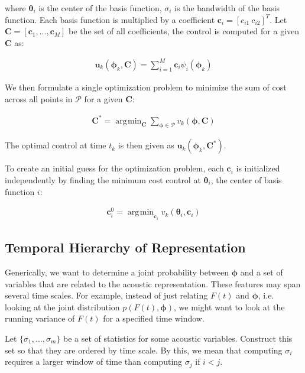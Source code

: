 \documentclass{article} %
\DeclareMathOperator*{\argmin}{\arg\!\min}
\begin{document}
where $\bm{\theta}_i$ is the center of the basis function, $\sigma_i$ is the bandwidth of
the basis function. Each basis function is multiplied by a coefficient
$\bm{c}_i = \left[ c_{i1} ~ c_{i2} \right]^T$. Let $\bm{C}=\left[ \bm{c}_1, ... ,\bm{c}_M \right]$
be the set of all coefficients, the control is computed for a given $\bm{C}$ as:

\begin{align*}
\bm{u}_k(\bm{\phi}_k, \bm{C}) = \sum_{i=1}^M \bm{c}_i \psi_i(\bm{\phi}_k)
\end{align*}

We then formulate a single optimization problem to minimize the sum of cost
across all points in $\mathcal{P}$ for a given $\bm{C}$:

\begin{align*}
\bm{C}^* = \argmin_{\bm{C}} \sum_{\bm{\phi} \in \mathcal{P}} v_k( \bm{\phi}, \bm{C} )
\end{align*}

The optimal control at time $t_k$ is then given as $\bm{u}_k(\bm{\phi}_k, \bm{C}^*)$.

To create an initial guess for the optimization problem, each $\bm{c}_i$ is initialized
independently by finding the minimum cost control at $\bm{\theta}_i$, the center of
basis function $i$:
   
\begin{align*}
\bm{c}_i^0 = \argmin_{\bm{c}_i} v_k( \bm{\theta}_i, \bm{c}_i )
\end{align*}


\iffalse
\subsection{Temporal Hierarchy of Representation}

Generically, we want to determine a joint probability between $\bm{\phi}$ and a set of
variables that are related to the acoustic representation. These features may span several
time scales. For example, instead of just relating $F(t)$ and $\bm{\phi}$, i.e. looking
at the joint distribution $p \left( F(t), \bm{\phi} \right)$, we might want to look
at the running variance of $F(t)$ for a specified time window.

Let $\{ \sigma_1, ..., \sigma_m \}$ be a set of statistics for some acoustic variables. Construct
this set so that they are ordered by time scale. By this, we mean that computing $\sigma_i$
requires a larger window of time than computing $\sigma_j$ if $i < j$.
\end{document}
